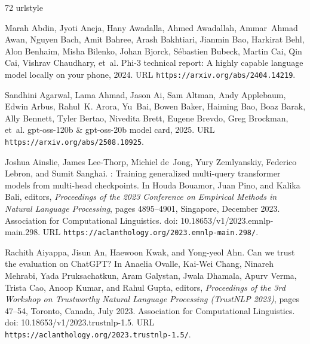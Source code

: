 \begin{thebibliography}{72}
\providecommand{\natexlab}[1]{#1}
\providecommand{\url}[1]{\texttt{#1}}
\expandafter\ifx\csname urlstyle\endcsname\relax
  \providecommand{\doi}[1]{doi: #1}\else
  \providecommand{\doi}{doi: \begingroup \urlstyle{rm}\Url}\fi

Marah Abdin, Jyoti Aneja, Hany Awadalla, Ahmed Awadallah, Ammar~Ahmad Awan, Nguyen Bach, Amit Bahree, Arash Bakhtiari, Jianmin Bao, Harkirat Behl, Alon Benhaim, Misha Bilenko, Johan Bjorck, Sébastien Bubeck, Martin Cai, Qin Cai, Vishrav Chaudhary, et~al.
\newblock Phi-3 technical report: A highly capable language model locally on your phone, 2024.
\newblock URL \url{https://arxiv.org/abs/2404.14219}.

Sandhini Agarwal, Lama Ahmad, Jason Ai, Sam Altman, Andy Applebaum, Edwin Arbus, Rahul~K. Arora, Yu~Bai, Bowen Baker, Haiming Bao, Boaz Barak, Ally Bennett, Tyler Bertao, Nivedita Brett, Eugene Brevdo, Greg Brockman, et~al.
\newblock gpt-oss-120b \& gpt-oss-20b model card, 2025.
\newblock URL \url{https://arxiv.org/abs/2508.10925}.

Joshua Ainslie, James Lee-Thorp, Michiel de~Jong, Yury Zemlyanskiy, Federico Lebron, and Sumit Sanghai.
: Training generalized multi-query transformer models from multi-head checkpoints.
\newblock In Houda Bouamor, Juan Pino, and Kalika Bali, editors, \emph{Proceedings of the 2023 Conference on Empirical Methods in Natural Language Processing}, pages 4895--4901, Singapore, December 2023. Association for Computational Linguistics.
\newblock \doi{10.18653/v1/2023.emnlp-main.298}.
\newblock URL \url{https://aclanthology.org/2023.emnlp-main.298/}.

Rachith Aiyappa, Jisun An, Haewoon Kwak, and Yong-yeol Ahn.
\newblock Can we trust the evaluation on {C}hat{GPT}?
\newblock In Anaelia Ovalle, Kai-Wei Chang, Ninareh Mehrabi, Yada Pruksachatkun, Aram Galystan, Jwala Dhamala, Apurv Verma, Trista Cao, Anoop Kumar, and Rahul Gupta, editors, \emph{Proceedings of the 3rd Workshop on Trustworthy Natural Language Processing (TrustNLP 2023)}, pages 47--54, Toronto, Canada, July 2023. Association for Computational Linguistics.
\newblock \doi{10.18653/v1/2023.trustnlp-1.5}.
\newblock URL \url{https://aclanthology.org/2023.trustnlp-1.5/}.


\end{thebibliography}
